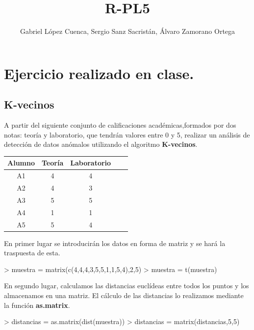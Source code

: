 \documentclass [a4paper] {article}
\title{R-PL5}
\author{Gabriel López Cuenca, Sergio Sanz Sacristán, Álvaro Zamorano Ortega}
\begin{document}


\maketitle

\graphicspath{ {./tmp/} }

\section{Ejercicio realizado en clase.}

\subsection{K-vecinos}
\bigskip
A partir del siguiente conjunto de calificaciones académicas,formados por dos notas: teoría y laboratorio, 
que tendrán valores entre 0 y 5, realizar un análisis de detección de datos anómalos utilizando el algoritmo
\textbf{K-vecinos}.

\begin{table}[H]
\begin{center}
\begin{tabular}{|c|c|c|c|c|}
\hline
Alumno & Teoría & Laboratorio\\
\hline \hline
A1 & 4 & 4 \\ \hline
A2 & 4 & 3 \\ \hline
A3 & 5 & 5 \\ \hline
A4 & 1 & 1 \\ \hline
A5 & 5 & 4 \\ \hline
\end{tabular}
\end{center}
\end{table}

En primer lugar se introducirán los datos en forma de matriz y se hará la traspuesta de esta.
\begin{Schunk}
\begin{Sinput}
> muestra = matrix(c(4,4,4,3,5,5,1,1,5,4),2,5)
> muestra = t(muestra)
\end{Sinput}
\end{Schunk}

\bigskip
En segundo lugar, calculamos las distancias euclídeas entre todos los puntos y los almacenamos 
en una matriz. El cálculo de las distancias lo realizamos mediante la función \textbf{as.matrix}. 

\bigskip
\begin{Schunk}
\begin{Sinput}
> distancias = as.matrix(dist(muestra))
> distancias = matrix(distancias,5,5)
\end{Sinput}
\end{Schunk}
\end{document}

